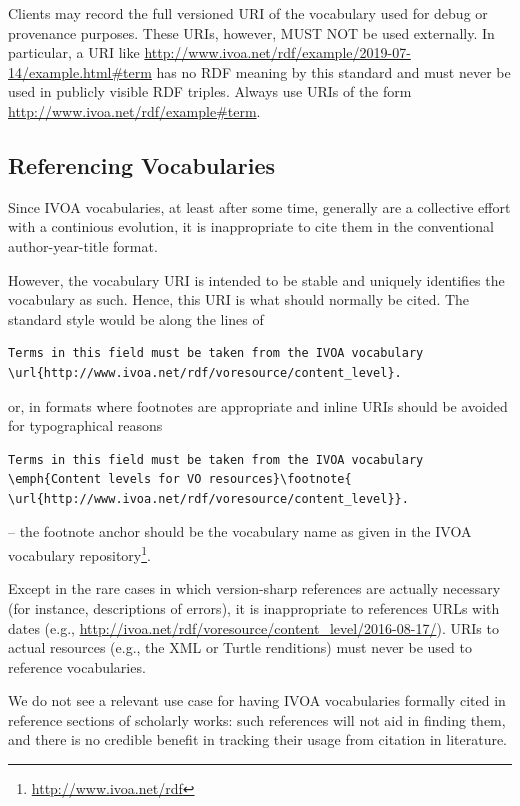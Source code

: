 \documentclass[11pt,a4paper]{ivoa}
\begin{document}
Clients may record the full versioned URI of the vocabulary used for
debug or provenance purposes.  These URIs, however, MUST NOT be used
externally.  In particular, a URI like
\url{http://www.ivoa.net/rdf/example/2019-07-14/example.html#term} has no
RDF meaning by this standard and must never be used in publicly visible
RDF triples.  Always use URIs of the form
\url{http://www.ivoa.net/rdf/example#term}.

\subsection{Referencing Vocabularies}

Since IVOA vocabularies, at least after some time, generally are a
collective effort with a continious evolution, it is inappropriate to
cite them in the conventional author-year-title format.

However, the vocabulary URI is intended to be stable and uniquely
identifies the vocabulary as such.  Hence, this URI is what should
normally be cited.  The standard style would be along the lines of
\begin{lstlisting}[language={}]
Terms in this field must be taken from the IVOA vocabulary
\url{http://www.ivoa.net/rdf/voresource/content_level}.
\end{lstlisting}
or, in formats where footnotes are appropriate and inline URIs should be
avoided for typographical reasons
\begin{lstlisting}[language={}]
Terms in this field must be taken from the IVOA vocabulary
\emph{Content levels for VO resources}\footnote{
\url{http://www.ivoa.net/rdf/voresource/content_level}}.
\end{lstlisting}
-- the footnote anchor should be the vocabulary name as given in the
IVOA vocabulary repository\footnote{\url{http://www.ivoa.net/rdf}}.

Except in the rare cases in which version-sharp references are actually
necessary (for instance, descriptions of errors), it is inappropriate to
references URLs with dates (e.g.,
\url{http://ivoa.net/rdf/voresource/content_level/2016-08-17/}).  URIs
to actual resources (e.g., the XML or Turtle renditions) must never be
used to reference vocabularies.

We do not see a relevant use case for having IVOA vocabularies formally
cited in reference sections of scholarly works: such references will not
aid in finding them, and there is no credible benefit in tracking their
usage from citation in literature.
\end{document}
